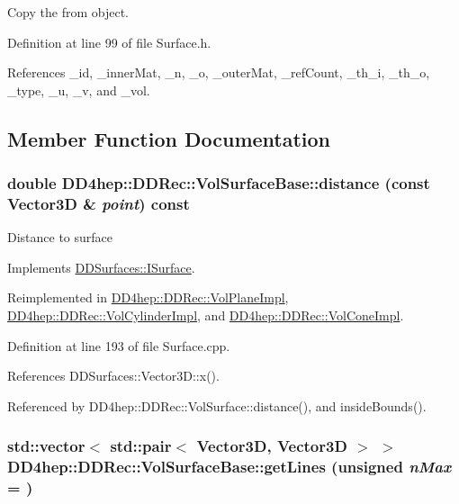 Copy the from object. 

Definition at line 99 of file Surface.h.

References \_\-id, \_\-innerMat, \_\-n, \_\-o, \_\-outerMat, \_\-refCount, \_\-th\_\-i, \_\-th\_\-o, \_\-type, \_\-u, \_\-v, and \_\-vol.

\subsection{Member Function Documentation}
\hypertarget{class_d_d4hep_1_1_d_d_rec_1_1_vol_surface_base_afb85bf6e8e6b87fb52e67e26609b1048}{
\subsubsection[{distance}]{\setlength{\rightskip}{0pt plus 5cm}double DD4hep::DDRec::VolSurfaceBase::distance (const {\bf Vector3D} \& {\em point}) const}}
\label{class_d_d4hep_1_1_d_d_rec_1_1_vol_surface_base_afb85bf6e8e6b87fb52e67e26609b1048}
Distance to surface 

Implements \hyperlink{class_d_d_surfaces_1_1_i_surface_a430ebd157354388b50218dfb356a9ca1}{DDSurfaces::ISurface}.

Reimplemented in \hyperlink{class_d_d4hep_1_1_d_d_rec_1_1_vol_plane_impl_ad75ba6e93463cf8ce312d312111c8391}{DD4hep::DDRec::VolPlaneImpl}, \hyperlink{class_d_d4hep_1_1_d_d_rec_1_1_vol_cylinder_impl_adb7ecbd032387e6e2a2903251e66e490}{DD4hep::DDRec::VolCylinderImpl}, and \hyperlink{class_d_d4hep_1_1_d_d_rec_1_1_vol_cone_impl_a28c958945f374cc59491e7ac4850bbde}{DD4hep::DDRec::VolConeImpl}.

Definition at line 193 of file Surface.cpp.

References DDSurfaces::Vector3D::x().

Referenced by DD4hep::DDRec::VolSurface::distance(), and insideBounds().\hypertarget{class_d_d4hep_1_1_d_d_rec_1_1_vol_surface_base_ad0863cf8ceb6a443a048fe89cdc79f26}{
\subsubsection[{getLines}]{\setlength{\rightskip}{0pt plus 5cm}std::vector$<$ std::pair$<$ {\bf Vector3D}, {\bf Vector3D} $>$ $>$ DD4hep::DDRec::VolSurfaceBase::getLines (unsigned {\em nMax} = {})}}
\label{class_d_d4hep_1_1_d_d_rec_1_1_vol_surface_base_ad0863cf8ceb6a443a048fe89cdc79f26}


